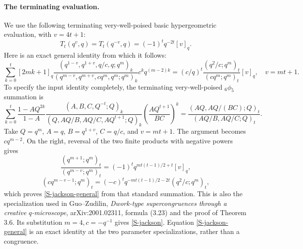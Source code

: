 \documentclass[11pt,letterpaper]{article}
\numberwithin{equation}{section}
\begin{document}
\paragraph{The terminating evaluation.}
We use the following terminating very-well-poised basic hypergeometric
evaluation, with $v=4t+1$:
\begin{equation}\label{S-jackson}
 T_t(q^{v},q)=T_t(q^{-v},q)=(-1)^t q^{-2t}[v]_q.
\end{equation}
Here is an exact general identity from which it follows:
\begin{equation}\label{S-jackson-general}
 \sum_{k=0}^{t}[2mk+1]_q
 \frac{(q^{1-v},q^{1+v},q/c,q;q^m)_k}
 {(q^{m-v},q^{m+v},cq^m,q^m;q^m)_k}
 c^k q^{(m-2)k}
 = (c/q)^t\frac{(q^2/c;q^m)_t}{(cq^m;q^m)_t}[v]_q,
 \quad v=mt+1.
\end{equation}
To specify the input identity completely, the terminating
very-well-poised ${}_6\phi_5$ summation is
\[
 \sum_{k=0}^t\frac{1-AQ^{2k}}{1-A}
 \frac{(A,B,C,Q^{-t};Q)_k}
 {(Q,AQ/B,AQ/C,AQ^{t+1};Q)_k}
 \left(\frac{AQ^{t+1}}{BC}\right)^k
 =\frac{(AQ,AQ/(BC);Q)_t}{(AQ/B,AQ/C;Q)_t}.
\]
Take $Q=q^m$, $A=q$, $B=q^{1+v}$, $C=q/c$, and $v=mt+1$.
The argument becomes $cq^{m-2}$. On the right, reversal of the
two finite products with negative powers gives
\[
 \frac{(q^{m+1};q^m)_t}{(q^{m-v};q^m)_t}
 =(-1)^tq^{mt(t-1)/2+t}[v]_q,
\]
\[
 (cq^{m-v-1};q^m)_t
 =(-c)^tq^{-mt(t-1)/2-2t}(q^2/c;q^m)_t,
\]
which proves \eqref{S-jackson-general} from that standard summation.
This is also the specialization used in Guo--Zudilin,
\emph{Dwork-type supercongruences
through a creative $q$-microscope}, arXiv:2001.02311, formula (3.23)
and the proof of Theorem 3.6. Its substitution $m=4,c=-q^{-1}$ gives
\eqref{S-jackson}. Equation \eqref{S-jackson-general} is an exact identity
at the two parameter specializations, rather than a congruence.
\end{document}
